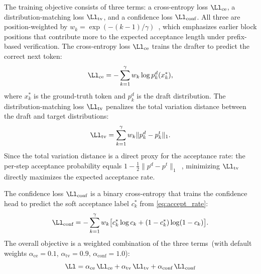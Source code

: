 The training objective consists of three terms: a cross-entropy loss $\Ll_{\text{ce}}$, a distribution-matching loss $\Ll_{\text{tv}}$, and a confidence loss $\Ll_{\text{conf}}$.
All three are position-weighted by $w_k = \exp(-(k{-}1)/\gamma)$~\citep{chen2026dflash}, which emphasizes earlier block positions that contribute more to the expected acceptance length under prefix-based verification.
The cross-entropy loss $\Ll_{\text{ce}}$ trains the drafter to predict the correct next token:
\begin{equation}
\Ll_{\text{ce}} = -\sum_{k=1}^{\gamma} w_k \log p^d_{k}(x_k^*),
\end{equation}
where $x_k^*$ is the ground-truth token and $p^d_k$ is the draft distribution.
The distribution-matching loss $\Ll_{\text{tv}}$ penalizes the total variation distance between the draft and target distributions:
\begin{equation}
\Ll_{\text{tv}} = \sum_{k=1}^{\gamma} w_k \|p_k^d - p_k^t\|_1.
\end{equation}
Since the total variation distance is a direct proxy for the acceptance rate: the per-step acceptance probability equals $1 - \frac{1}{2}\|p^d - p^t\|_1$~\citep{pmlr-v202-leviathan23a}, minimizing $\Ll_{\text{tv}}$ directly maximizes the expected acceptance rate.

The confidence loss $\Ll_{\text{conf}}$ is a binary cross-entropy that trains the confidence head to predict the soft acceptance label $c_k^*$ from \autoref{eq:accept_rate}:
\begin{equation}
\Ll_{\text{conf}} = -\sum_{k=1}^{\gamma} w_k \bigl[c_k^* \log c_k + (1 - c_k^*) \log(1 - c_k)\bigr].
\end{equation}
The overall objective is a weighted combination of the three terms~(with default weights $\alpha_{\text{ce}} = 0.1$, $\alpha_{\text{tv}} = 0.9$, $\alpha_{\text{conf}} = 1.0$):
\begin{equation}
\Ll = \alpha_{\text{ce}}\,\Ll_{\text{ce}} + \alpha_{\text{tv}}\,\Ll_{\text{tv}} + \alpha_{\text{conf}}\,\Ll_{\text{conf}}
\label{eq:loss}
\end{equation}



